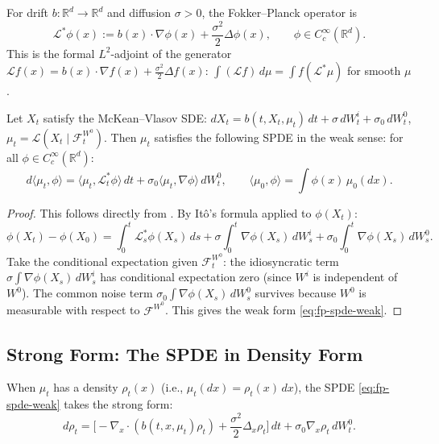 \begin{definition}
For drift $b : \mathbb{R}^d \to \mathbb{R}^d$ and diffusion $\sigma > 0$, the
Fokker--Planck operator is
\[
    \mathcal{L}^* \phi(x) := b(x) \cdot \nabla\phi(x) + \frac{\sigma^2}{2}
    \Delta\phi(x), \qquad \phi \in C_c^\infty(\mathbb{R}^d).
\]
This is the formal $L^2$-adjoint of the generator
$\mathcal{L} f(x) = b(x) \cdot \nabla f(x) + \frac{\sigma^2}{2}\Delta f(x)$:
$\int (\mathcal{L}f)\, d\mu = \int f (\mathcal{L}^* \mu)$ for smooth $\mu$.
\end{definition}

\begin{theorem}
\label{thm:fokker-planck-spde}
Let $X_t$ satisfy the McKean--Vlasov SDE: $dX_t = b(t,X_t,\mu_t)\, dt + \sigma\, dW_t^i
+ \sigma_0\, dW_t^0$, $\mu_t = \mathcal{L}(X_t \mid \mathcal{F}_t^{W^0})$. Then $\mu_t$
satisfies the following SPDE in the weak sense: for all $\phi \in C_c^\infty(\mathbb{R}^d)$:
\begin{equation}
    d\langle \mu_t, \phi \rangle = \langle \mu_t, \mathcal{L}_t^* \phi \rangle\, dt +
    \sigma_0 \langle \mu_t, \nabla\phi \rangle\, dW_t^0, \qquad \langle \mu_0, \phi
    \rangle = \int \phi(x)\, \mu_0(dx).
    \label{eq:fp-spde-weak}
\end{equation}
\end{theorem}

\begin{proof}
This follows directly from . By It\^o's formula applied
to $\phi(X_t)$:
\[
    \phi(X_t) - \phi(X_0) = \int_0^t \mathcal{L}_s^* \phi(X_s)\, ds + \sigma \int_0^t
    \nabla\phi(X_s)\, dW_s^i + \sigma_0 \int_0^t \nabla\phi(X_s)\, dW_s^0.
\]
Take the conditional expectation given $\mathcal{F}_t^{W^0}$: the idiosyncratic term
$\sigma \int \nabla\phi(X_s)\, dW_s^i$ has conditional expectation zero (since $W^i$ is
independent of $W^0$). The common noise term $\sigma_0 \int \nabla\phi(X_s)\, dW_s^0$
survives because $W^0$ is measurable with respect to $\mathcal{F}^{W^0}$. This gives
the weak form \eqref{eq:fp-spde-weak}.
\end{proof}

\subsection{Strong Form: The SPDE in Density Form}

When $\mu_t$ has a density $\rho_t(x)$ (i.e., $\mu_t(dx) = \rho_t(x)\, dx$), the SPDE
\eqref{eq:fp-spde-weak} takes the strong form:
\begin{equation}
    d\rho_t = \big[-\nabla_x \cdot (b(t,x,\mu_t)\rho_t) + \frac{\sigma^2}{2}
    \Delta_x \rho_t\big]\, dt + \sigma_0 \nabla_x \rho_t\, dW_t^0.
    \label{eq:fp-spde-strong}
\end{equation}

